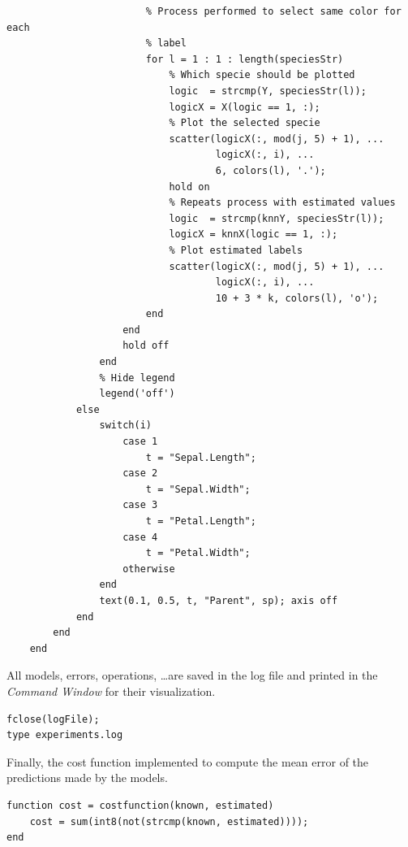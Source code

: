 \documentclass[11pt]{article}
\begin{document}
\begin{verbatim}
                        % Process performed to select same color for each 
                        % label
                        for l = 1 : 1 : length(speciesStr)
                            % Which specie should be plotted
                            logic  = strcmp(Y, speciesStr(l));
                            logicX = X(logic == 1, :);
                            % Plot the selected specie
                            scatter(logicX(:, mod(j, 5) + 1), ...
                                    logicX(:, i), ...
                                    6, colors(l), '.');
                            hold on
                            % Repeats process with estimated values
                            logic  = strcmp(knnY, speciesStr(l));
                            logicX = knnX(logic == 1, :);
                            % Plot estimated labels
                            scatter(logicX(:, mod(j, 5) + 1), ...
                                    logicX(:, i), ...
                                    10 + 3 * k, colors(l), 'o');
                        end
                    end
                    hold off
                end
                % Hide legend
                legend('off')
            else
                switch(i)
                    case 1
                        t = "Sepal.Length";
                    case 2
                        t = "Sepal.Width";
                    case 3
                        t = "Petal.Length";
                    case 4
                        t = "Petal.Width";
                    otherwise
                end
                text(0.1, 0.5, t, "Parent", sp); axis off
            end
        end
    end\end{verbatim}

All models, errors, operations, \ldots are saved in the log file and printed in 
the \textit{Command Window} for their visualization.

\begin{verbatim}
fclose(logFile);
type experiments.log
\end{verbatim}

Finally, the cost function implemented to compute the mean error of the
predictions made by the models.

\begin{verbatim}
function cost = costfunction(known, estimated)
    cost = sum(int8(not(strcmp(known, estimated))));
end
\end{verbatim}
\end{document}
